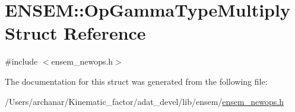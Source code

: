 \hypertarget{structENSEM_1_1OpGammaTypeMultiply}{}\section{E\+N\+S\+EM\+:\+:Op\+Gamma\+Type\+Multiply Struct Reference}
\label{structENSEM_1_1OpGammaTypeMultiply}


{\ttfamily \#include $<$ensem\+\_\+newops.\+h$>$}



The documentation for this struct was generated from the following file\+:\begin{DoxyCompactItemize}
\item 
/\+Users/archanar/\+Kinematic\+\_\+factor/adat\+\_\+devel/lib/ensem/\mbox{\hyperlink{lib_2ensem_2ensem__newops_8h}{ensem\+\_\+newops.\+h}}\end{DoxyCompactItemize}
